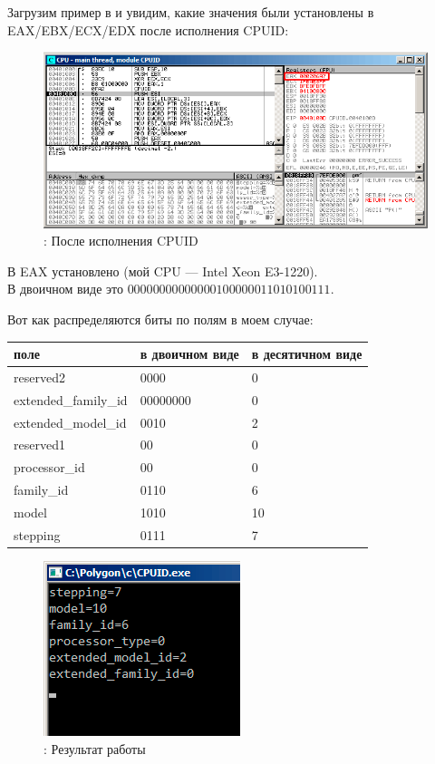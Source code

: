 ﻿\clearpage
{}
\myindex{\olly}

Загрузим пример в \olly и увидим, какие значения были установлены в EAX/EBX/ECX/EDX после исполнения CPUID: 

\begin{figure}[H]
\centering
\includegraphics[scale=\FigScale]{patterns/15_structs/6_bitfields/cpuid/olly.png}
\caption{\olly: После исполнения CPUID}
\label{fig:cpuid_olly_1}
\end{figure}

В EAX установлено  (мой \ac{CPU} --- Intel Xeon E3-1220).\\
В двоичном виде это $0000 0000 0000 0010 0000 0110 1010 0111$.

Вот как распределяются биты по полям в моем случае:

\begin{center}
\begin{tabular}{ | l | l | l | }
\hline
\headercolor{} поле &
\headercolor{} в двоичном виде &
\headercolor{} в десятичном виде \\
\hline
reserved2		& 0000 & 0 \\
\hline
extended\_family\_id	& 00000000 & 0 \\
\hline
extended\_model\_id	& 0010 & 2 \\
\hline
reserved1		& 00 & 0 \\
\hline
processor\_id		& 00 & 0 \\
\hline
family\_id		& 0110 & 6 \\
\hline
model			& 1010 & 10 \\
\hline
stepping		& 0111 & 7 \\
\hline
\end{tabular}
\end{center}

\begin{figure}[H]
\centering
\includegraphics[scale=\NormalScale]{patterns/15_structs/6_bitfields/cpuid/result.png}
\caption{\olly: Результат работы}
\label{fig:cpuid_olly_2}
\end{figure}
